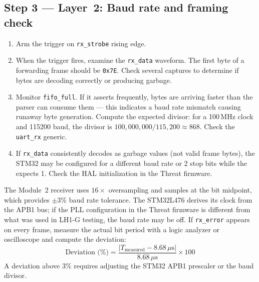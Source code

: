 \documentclass[11pt,letterpaper]{article}
\begin{document}
\subsection{Step 3 --- Layer~2: Baud rate and framing check}
\begin{enumerate}[leftmargin=2em]
	\item Arm the trigger on \texttt{rx\_strobe} rising edge.
	\item When the trigger fires, examine the \texttt{rx\_data} waveform. The first byte of a forwarding frame should be \texttt{0x7E}. Check several captures to determine if bytes are decoding correctly or producing garbage.
	\item Monitor \texttt{fifo\_full}. If it asserts frequently, bytes are arriving faster than the parser can consume them --- this indicates a baud rate mismatch causing runaway byte generation. Compute the expected divisor: for a 100\,MHz \FPGA{} clock and 115200 baud, the divisor is $100{,}000{,}000 / 115{,}200 \approx 868$. Check the \VHDL{} \texttt{uart\_rx} generic.
	\item If \texttt{rx\_data} consistently decodes as garbage values (not valid frame bytes), the STM32 may be configured for a different baud rate or 2 stop bits while the \FPGA{} expects 1. Check the HAL \UART{} initialization in the Threat firmware.
\end{enumerate}

\begin{tcolorbox}[infobox={Baud Rate Deviation Tolerance}]
	The Module~2 \UART{} receiver uses $16\times$ oversampling and samples at the bit midpoint, which provides $\pm 3\%$ baud rate tolerance. The STM32L476 derives its \UART{} clock from the \mbox{APB1} bus; if the \mbox{PLL} configuration in the Threat firmware is different from what was used in LH1-G testing, the baud rate may be off. If \texttt{rx\_error} appears on every frame, measure the actual bit period with a logic analyzer or oscilloscope and compute the deviation:
	\[
		\text{Deviation (\%)} = \frac{|T_{\text{measured}} - 8.68\,\mu\text{s}|}{8.68\,\mu\text{s}} \times 100
	\]
	A deviation above 3\% requires adjusting the STM32 \mbox{APB1} prescaler or the \FPGA{} baud divisor.
\end{tcolorbox}

\newpage
\end{document}
